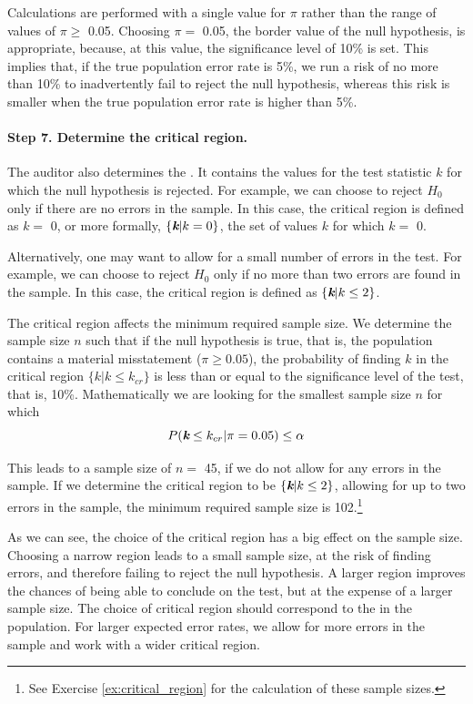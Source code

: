 Calculations are performed with a single value for $\pi$ rather than the range of values of $\pi \geq$ 0.05. Choosing $\pi =$ 0.05, the border value of the null hypothesis, is appropriate, because, at this value, the significance level of 10\% is set. This implies that, if the true population error rate is 5\%, we run a risk of no more than 10\% to inadvertently fail to reject the null hypothesis, whereas this risk is smaller when the true population error rate is higher than 5\%.

\paragraph{Step 7. Determine the critical region.} The auditor also determines the . It contains the values for the test statistic $k$ for which the null hypothesis is rejected. For example, we can choose to reject $H_0$ only if there are no errors in the sample. In this case, the critical region is defined as $k = $ 0, or more formally, $\{\textit{\textbf{k}} | k = 0\}$, the set of values $k$ for which $k =$ 0. 

Alternatively, one may want to allow for a small number of errors in the test. For example, we can choose to reject $H_0$ only if no more than two errors are found in the sample. In this case, the critical region is defined as  $\{\textit{\textbf{k}} | k \leq 2\}$.

\bigskip
The critical region affects the minimum required sample size. We determine the sample size $n$ such that if the null hypothesis is true, that is, the population contains a material misstatement ($\pi \geq 0.05$), the probability of finding $k$ in the critical region $\{k | k \leq k_{cr}\}$ is less than or equal to the significance level of the test, that is, 10\%. Mathematically we are looking for the smallest sample size $n$ for which
\begin{equation}
P(\textit{\textbf{k}} \leq k_{cr} | \pi = 0.05) \leq \alpha
\label{eq:sample_size_calculation_att}
\end{equation}

This leads to a sample size of $n =$ 45, if we do not allow for any errors in the sample. If we determine the critical region to be $\{\textit{\textbf{k}} | k \leq 2\}$, allowing for up to two errors in the sample, the minimum required sample size is 102.\footnote{See Exercise \ref{ex:critical_region} for the calculation of these sample sizes.}

As we can see, the choice of the critical region has a big effect on the sample size. Choosing a narrow region leads to a small sample size, at the risk of finding errors, and therefore failing to reject the null hypothesis. A larger region improves the chances of being able to conclude on the test, but at the expense of a larger sample size. The choice of critical region should correspond to the  in the population. For larger expected error rates, we allow for more errors in the sample and work with a wider critical region.

